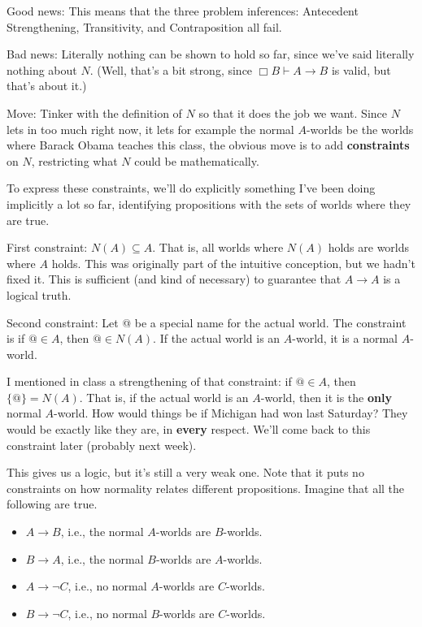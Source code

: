 \documentclass[
]{article}
\providecommand{\tightlist}{%
  \setlength{\itemsep}{0pt}\setlength{\parskip}{0pt}}\usepackage{longtable,booktabs,array}
\begin{document}
Good news: This means that the three problem inferences: Antecedent
Strengthening, Transitivity, and Contraposition all fail.

Bad news: Literally nothing can be shown to hold so far, since we've
said literally nothing about \(N\). (Well, that's a bit strong, since
\(\Box B \vdash A \rightarrow B\) is valid, but that's about it.)

Move: Tinker with the definition of \(N\) so that it does the job we
want. Since \(N\) lets in too much right now, it lets for example the
normal \(A\)-worlds be the worlds where Barack Obama teaches this class,
the obvious move is to add \textbf{constraints} on \(N\), restricting
what \(N\) could be mathematically.

To express these constraints, we'll do explicitly something I've been
doing implicitly a lot so far, identifying propositions with the sets of
worlds where they are true.

First constraint: \(N(A) \subseteq A\). That is, all worlds where
\(N(A)\) holds are worlds where \(A\) holds. This was originally part of
the intuitive conception, but we hadn't fixed it. This is sufficient
(and kind of necessary) to guarantee that \(A \rightarrow A\) is a
logical truth.

Second constraint: Let @ be a special name for the actual world. The
constraint is if \(@ \in A\), then \(@ \in N(A)\). If the actual world
is an \(A\)-world, it is a normal \(A\)-world.

I mentioned in class a strengthening of that constraint: if \(@ \in A\),
then \(\{@\} = N(A)\). That is, if the actual world is an \(A\)-world,
then it is the \textbf{only} normal \(A\)-world. How would things be if
Michigan had won last Saturday? They would be exactly like they are, in
\textbf{every} respect. We'll come back to this constraint later
(probably next week).

This gives us a logic, but it's still a very weak one. Note that it puts
no constraints on how normality relates different propositions. Imagine
that all the following are true.

\begin{itemize}
\tightlist
\item
  \(A \rightarrow B\), i.e., the normal \(A\)-worlds are \(B\)-worlds.
\item
  \(B \rightarrow A\), i.e., the normal \(B\)-worlds are \(A\)-worlds.
\item
  \(A \rightarrow \neg C\), i.e., no normal \(A\)-worlds are
  \(C\)-worlds.
\item
  \(B \rightarrow \neg C\), i.e., no normal \(B\)-worlds are
  \(C\)-worlds.
\end{itemize}
\end{document}
